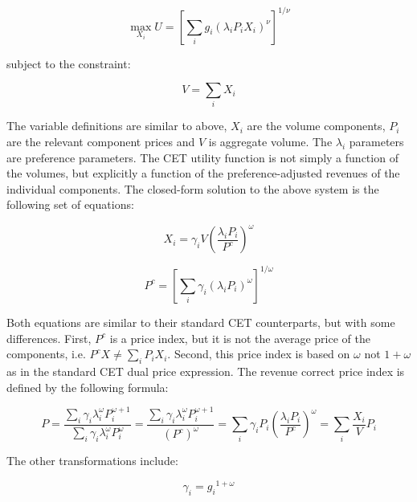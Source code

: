 \begin{displaymath}
\max_{X_i} {U={\left[ \sum\limits_i {g_i \left(\lambda_i P_i X_i \right)^{\nu}} \right]}^{1/\nu}}
\end{displaymath}

\noindent subject to the constraint:

\begin{displaymath}
V=\sum\limits_{i} {X_i}
\end{displaymath}

\noindent The variable definitions are similar to above, $X_i$ are the volume components, $P_i$ are the
relevant component prices and $V$ is aggregate volume. The $\lambda_i$ parameters are
preference parameters. The CET utility function is not simply a function of the volumes,
but explicitly a function of the preference-adjusted revenues of the individual components.
The closed-form solution to the above system is the following set of equations:

\begin{equation}
\label{eq:CETAllocX}
X_i = \gamma_i V {\left( \frac {\lambda_i P_i}{P^c} \right)}^\omega
\end{equation}

\begin{equation}
\label{eq:CETAllocP}
P^c={\left[ \sum\limits_i {\gamma_i \left( \lambda_i P_i \right)^{\omega}} \right]}^{1/\omega}
\end{equation}

\noindent Both equations are similar to their standard CET counterparts, but with some differences.
First, $P^c$ is a price index, but it is not the
average price of the components, i.e. $P^c X \ne \sum_i{P_i X_i}$. Second, this price index
is based on $\omega$ not $1 + \omega$ as in the standard CET dual price expression. The revenue
correct price index is defined by the following formula:

\begin{equation}
\label{eq:CETAllocPa}
P=\frac{ \sum\limits_i {\gamma_i  \lambda_i^\omega P_i^{\omega+1} } }{ \sum\limits_i {\gamma_i  \lambda_i^\omega P_i^{\omega} } }
 = \frac{ \sum\limits_i {\gamma_i  \lambda_i^\omega P_i^{\omega+1} } }{\left({P^c}\right)^\omega} = \sum\limits_i {\gamma_i P_i \left( \frac{\lambda_i P_i}{P^c} \right)^\omega}
 = \sum\limits_i {\frac{X_i}{V} P_i }
\end{equation}

\noindent The other transformations
include:

\begin{displaymath}
\gamma_i={g_i}^{1+\omega}
\end{displaymath}

